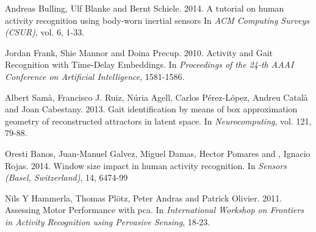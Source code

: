 \documentclass[a0paper,portrait]{baposter}
\begin{document}
\begin{poster}
{\begin{thebibliography}{1}
  
  Andreas Bulling, Ulf Blanke and Bernt Schiele. 2014.
  \newblock A tutorial on human activity recognition using body-worn inertial sensors
  \newblock In {\em ACM Computing Surveys (CSUR)}, vol. 6, 1-33.
  
  Jordan Frank, Shie Mannor and Doina Precup. 2010. 
  \newblock Activity and Gait Recognition with Time-Delay Embeddings.
  \newblock In {\em Proceedings of the 24-th AAAI Conference on Artificial Intelligence}, 1581-1586.
  
  Albert Samà, Francisco J. Ruiz, Núria Agell, Carlos Pérez-López, Andreu Català and Joan Cabestany. 2013.
  \newblock Gait identification by means of box approximation geometry of reconstructed attractors in latent space.
  \newblock In {\em Neurocomputing}, vol. 121, 79-88.

  
 
   Oresti Banos, Juan-Manuel Galvez, Miguel Damas, Hector Pomares and , Ignacio Rojas. 2014.
   \newblock Window size impact in human activity recognition.
   \newblock In {\em Sensors (Basel, Switzerland)}, 14, 6474-99

   
%   
  

  
  Nils Y Hammerla, Thomas Plötz, Peter Andras and Patrick Olivier. 2011.
  \newblock Assessing Motor Performance with pca.
  \newblock In {\em International Workshop on Frontiers in Activity Recognition using Pervasive Sensing}, 18-23.

 

\end{thebibliography}
}


\end{poster}
\end{document}
